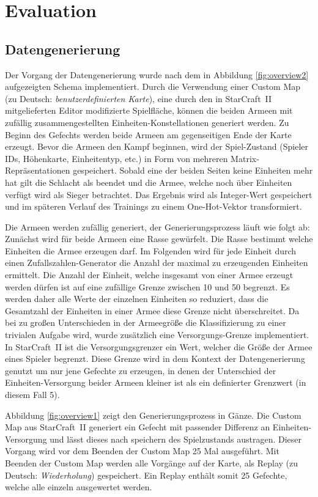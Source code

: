 \section{Evaluation}

\subsection{Datengenerierung}
\label{datagen}

Der Vorgang der Datengenerierung wurde nach dem in Abbildung \ref{fig:overview2} aufgezeigten Schema implementiert. Durch die Verwendung einer Custom Map (zu Deutsch: \textit{benutzerdefinierten Karte}), eine durch den in StarCraft~II mitgelieferten Editor modifizierte Spielfläche, können die beiden Armeen mit zufällig zusammengestellten Einheiten-Konstellationen generiert werden. Zu Beginn des Gefechts werden beide Armeen am gegenseitigen Ende der Karte erzeugt. Bevor die Armeen den Kampf beginnen, wird der Spiel-Zustand (Spieler IDs, Höhenkarte, Einheitentyp, etc.) in Form von mehreren Matrix-Repräsentationen gespeichert. Sobald eine der beiden Seiten keine Einheiten mehr hat gilt die Schlacht als beendet und die Armee, welche noch über Einheiten verfügt wird als Sieger betrachtet. Das Ergebnis wird als Integer-Wert gespeichert und im späteren Verlauf des Trainings zu einem One-Hot-Vektor transformiert. 

Die Armeen werden zufällig generiert, der Generierungsprozess läuft wie folgt ab: Zunächst wird für beide Armeen eine Rasse gewürfelt. Die Rasse bestimmt welche Einheiten die Armee erzeugen darf. Im Folgenden wird für jede Einheit durch einen Zufallszahlen-Generator die Anzahl der maximal zu erzeugenden Einheiten ermittelt. Die Anzahl der Einheit, welche insgesamt von einer Armee erzeugt werden dürfen ist auf eine zufällige Grenze zwischen 10 und 50 begrenzt. Es werden daher alle Werte der einzelnen Einheiten so reduziert, dass die Gesamtzahl der Einheiten in einer Armee diese Grenze nicht überschreitet. Da bei zu großen Unterschieden in der Armeegröße die Klassifizierung zu einer trivialen Aufgabe wird, wurde zusätzlich eine Versorgungs-Grenze implementiert. In StarCraft~II ist die Versorgungsgrenzer ein Wert, welcher die Größe der Armee eines Spieler begrenzt. Diese Grenze wird in dem Kontext der Datengenerierung genutzt um nur jene Gefechte zu erzeugen, in denen der Unterschied der Einheiten-Versorgung beider Armeen kleiner ist als ein definierter Grenzwert (in diesem Fall 5).

Abbildung \ref{fig:overview1} zeigt den Generierungsprozess in Gänze. Die Custom Map aus StarCraft~II generiert ein Gefecht mit passender Differenz an Einheiten-Versorgung und lässt dieses nach speichern des Spielzustands austragen. Dieser Vorgang wird vor dem Beenden der Custom Map 25 Mal ausgeführt. Mit Beenden der Custom Map werden alle Vorgänge auf der Karte, als Replay (zu Deutsch: \textit{Wiederholung}) gespeichert. Ein Replay enthält somit 25 Gefechte, welche alle einzeln ausgewertet werden. 

